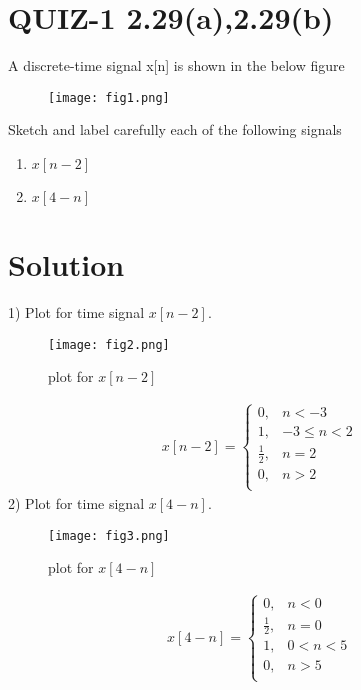 \documentclass[journal,12pt,twocolumn]{IEEEtran}
\begin{document}
\section*{QUIZ-1 2.29(a),2.29(b)}
A discrete-time signal x[n] is shown in the below figure
\begin{figure}[htp]
    \centering
    \texttt{[image: fig1.png]}
    \label{fig:my_label}
\end{figure}
Sketch and label carefully each of the following signals
\begin{enumerate}
    \item $x[n-2]$
    \item $x[4-n]$
\end{enumerate}
\section*{Solution}
1) Plot for time signal $x[n-2]$.
\begin{figure}[htp]
    \centering
    \texttt{[image: fig2.png]}
    \caption{plot for $x[n-2]$}
    \label{fig:my_label}
\end{figure}
\begin{align}
x[n-2]=
\begin{cases}
    0, &   n < -3 \\
    1, &  -3 \leq n < 2 \\
    \frac{1}{2} , &   n = 2\\
    0, & n>2\\
\end{cases}
\end{align}
2) Plot for time signal $x[4-n]$.
\begin{figure}[htp]
    \centering
    \texttt{[image: fig3.png]}
      \caption{plot for $x[4-n]$}
    \label{fig:my_label}
\end{figure}
\begin{align}
x[4-n]=
\begin{cases}
    0, &   n < 0 \\
    \frac{1}{2} , &   n = 0\\
    1, &  0 < n < 5 \\
    0, & n>5\\
\end{cases}
\end{align}
\end{document}
